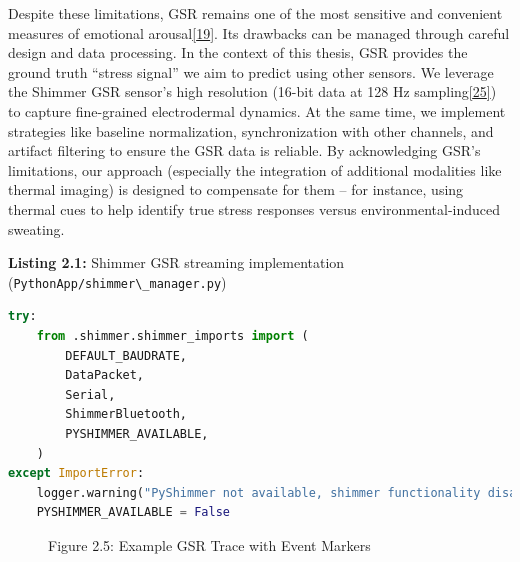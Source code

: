 \documentclass[12pt,a4paper]{article}
\begin{document}
Despite these limitations, GSR remains one of the most sensitive and convenient measures of emotional arousal\href{https://imotions.com/blog/learning/research-fundamentals/galvanic-skin-response/\#:~:text=Galvanic\%20Skin\%20Response\%20originates\%20from,that\%20can\%20be\%20quantified\%20statistically}{{[}19{]}}. Its drawbacks can be managed through careful design and data processing. In the context of this thesis, GSR provides the ground truth ``stress signal'' we aim to predict using other sensors. We leverage the Shimmer GSR sensor's high resolution (16-bit data at 128 Hz sampling\href{https://github.com/buccancs/gsr_rgbt_project/blob/ea44d0298e0379541f112f76eb809976f3771fa3/docs/hardware.md\#L118-L126}{{[}25{]}}) to capture fine-grained electrodermal dynamics. At the same time, we implement strategies like baseline normalization, synchronization with other channels, and artifact filtering to ensure the GSR data is reliable. By acknowledging GSR's limitations, our approach (especially the integration of additional modalities like thermal imaging) is designed to compensate for them -- for instance, using thermal cues to help identify true stress responses versus environmental-induced sweating.

\textbf{Listing 2.1:} Shimmer GSR streaming implementation (\passthrough{\lstinline!PythonApp/shimmer\_manager.py!})

\begin{lstlisting}[language=Python]
try:
    from .shimmer.shimmer_imports import (
        DEFAULT_BAUDRATE,
        DataPacket,
        Serial,
        ShimmerBluetooth,
        PYSHIMMER_AVAILABLE,
    )
except ImportError:
    logger.warning("PyShimmer not available, shimmer functionality disabled")
    PYSHIMMER_AVAILABLE = False
\end{lstlisting}

\begin{figure}
\centering
{}
\caption{Figure 2.5: Example GSR Trace with Event Markers}
\end{figure}
\end{document}
